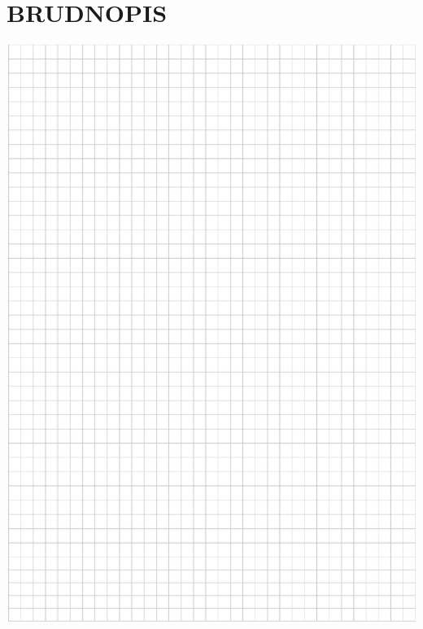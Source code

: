 \documentclass[10pt]{article}
\begin{document}
\section*{BRUDNOPIS}
\begin{center}
\includegraphics[max width=\textwidth]{2024_11_21_b8ac5f500a5bbb1b4ec5g-18}
\end{center}
\end{document}

